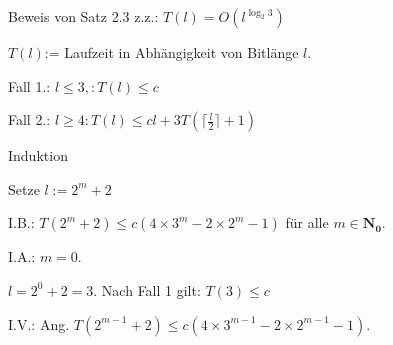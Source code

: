 \documentclass[10pt]{beamer}
\begin{document}
\begin{frame}{Beweis von Satz 2.3}
    z.z.: $T(l) = O\left(l^{\log_2 3}\right)$

\vspace{0.2cm}
$T(l)$:= Laufzeit in Abhängigkeit von Bitlänge $l$. 


\vspace{0.3cm}
\noindent Fall 1.:  $ l \leq 3,: T(l) \leq c$

\vspace{0.3cm}
\noindent Fall 2.: $l \geq 4: T(l) \leq cl+ 3T (\lceil \frac{l}{2} \rceil +1) $

\vspace{0.7cm}

\end{frame}  

\begin{frame}{Induktion}

Setze $ l:= 2^m +2$

\vspace{0.4cm}

\noindent I.B.: $T( 2^m +2) \leq c (4 \times 3^m -2\times 2^m -1)$ für alle $ m \in \mathbf{N_0} $.

\vspace{0.3cm}

\noindent I.A.: $m=0$.

$l= 2^0 +2= 3$.   Nach Fall 1 gilt: $T(3) \leq c$

\vspace{0.3cm}
\noindent I.V.: Ang. $T(2^{m-1} +2) \leq c ( 4\times 3^{m-1} - 2 \times 2^{m-1} -1)$.

    
\end{frame}
\end{document}
